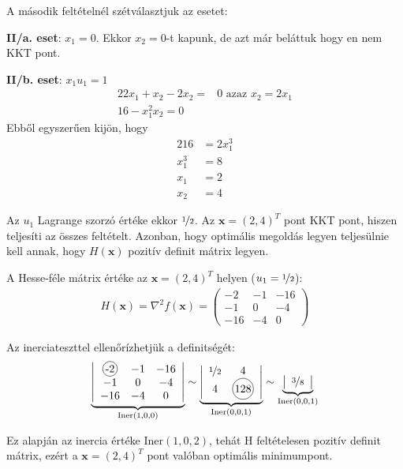 \begin{megoldas}
A második feltételnél szétválasztjuk az esetet:

\indent\indent\textbf{II/a. eset}: $x_1=0$. Ekkor $x_2=0$-t kapunk, de azt már beláttuk hogy en nem KKT pont.

\indent\indent\textbf{II/b. eset}: $x_1u_1=1$
\begin{alignat*}{2}
2x_1+x_2-2x_2=&0 \mbox{ azaz } x_2=2x_1\\
16-x_1^2x_2=0
\end{alignat*}
\indent Ebből egyszerűen kijön, hogy
\begin{alignat*}{2}
16&=2x_1^3\\
x_1^3&=8\\
x_1&=2\\
x_2&=4
\end{alignat*}

Az $u_1$ Lagrange szorzó értéke ekkor $\nicefrac{1}{2}$. Az $\mathbf{x}=(2,4)^T$ pont KKT pont, hiszen teljesíti az összes feltételt. Azonban, hogy optimális megoldás legyen teljesülnie kell annak, hogy $H(\textbf{x})$ pozitív definit mátrix legyen.
\end{megoldas}

\begin{megoldas}
A Hesse-féle mátrix értéke az $\mathbf{x}=(2,4)^T$ helyen ($u_1=\nicefrac{1}{2}$):
\begin{gather*}
H(\mathbf{x})=\nabla^2f(\mathbf{x})=\begin{pmatrix}-2&-1&-16\\-1&0&-4\\-16&-4&0\end{pmatrix}
\end{gather*}

Az inerciateszttel ellenőrízhetjük a definitségét:
\begin{gather*}
\underbrace{\left|\begin{array}{ccc}\circled{-2}&-1&-16\\-1&0&-4\\-16&-4&0\end{array}\right|}_\text{Iner(1,0,0)}\sim
\underbrace{\left|\begin{array}{cc}\nicefrac{1}{2}&4\\4&\circled{128}\end{array}\right|}_\text{Iner(0,0,1)}\sim\underbrace{\left|\begin{array}{c}\nicefrac{3}{8}\end{array}\right|}_\text{Iner(0,0,1)}
\end{gather*}

Ez alapján az inercia értéke $\mbox{Iner}(1,0,2)$, tehát H feltételesen pozitív definit mátrix, ezért a $\mathbf{x}=(2,4)^T$ pont valóban optimális minimumpont.
\end{megoldas}
